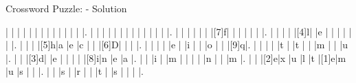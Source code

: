 \documentclass[12pt]{article}
\begin{document}
\newpage
\begin{center}
  \huge{Crossword Puzzle: - Solution}
\end{center}
\vspace{1.5cm}
\PuzzleSolution
\begin{Puzzle}{15}{15}
  |{}  |{}  |{}  |{}  |{}  |{}  |{}  |{}  |{}  |{}  |{}  |{}  |{}  |.
  |{}  |{}  |{}  |{}  |{}  |{}  |{}  |{}  |{}  |{}  |{}  |{}  |{}  |.
  |{}  |{}  |{}  |{}  |{}  |{}  |[7]f|{}  |{}  |{}  |{}  |{}  |{}  |.
  |{}  |{}  |{}  |{}  |[4]l|{}  |e   |{}  |{}  |{}  |{}  |{}  |{}  |.
  |{}  |{}  |{}  |[5]h|a   |e   |c   |{}  |{}  |[6]D|{}  |{}  |{}  |.
  |{}  |{}  |{}  |{}  |e   |{}  |i   |{}  |{}  |o   |{}  |{}  |[9]q|.
  |{}  |{}  |{}  |{}  |t   |{}  |t   |{}  |{}  |m   |{}  |{}  |u   |.
  |{}  |{}  |[3]d|{}  |e   |{}  |{}  |{}  |{}  |[8]i|n   |e   |a   |.
  |{}  |{}  |i   |{}  |m   |{}  |{}  |{}  |{}  |n   |{}  |{}  |m   |.
  |{}  |{}  |[2]e|x   |u   |l   |t   |[1]e|m   |u   |s   |{}  |{}  |.
  |{}  |{}  |s   |{}  |r   |{}  |{}  |t   |{}  |s   |{}  |{}  |{}  |.
\end{Puzzle}
\end{document}
